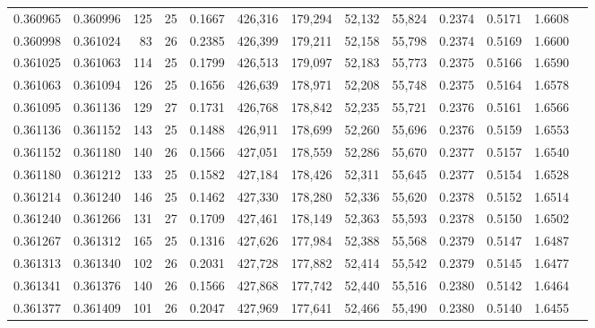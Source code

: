 \begin{tabular}{rrrrrrrrrrrrr}
0.360965 & 0.360996 &   125 &  25 &                                     0.1667 & 426,316 & 179,294 &  52,132 &  55,824 & 0.2374 & 0.5171 & 1.6608 \\
0.360998 & 0.361024 &    83 &  26 &                                     0.2385 & 426,399 & 179,211 &  52,158 &  55,798 & 0.2374 & 0.5169 & 1.6600 \\
0.361025 & 0.361063 &   114 &  25 &                                     0.1799 & 426,513 & 179,097 &  52,183 &  55,773 & 0.2375 & 0.5166 & 1.6590 \\
0.361063 & 0.361094 &   126 &  25 &                                     0.1656 & 426,639 & 178,971 &  52,208 &  55,748 & 0.2375 & 0.5164 & 1.6578 \\
0.361095 & 0.361136 &   129 &  27 &                                     0.1731 & 426,768 & 178,842 &  52,235 &  55,721 & 0.2376 & 0.5161 & 1.6566 \\
0.361136 & 0.361152 &   143 &  25 &                                     0.1488 & 426,911 & 178,699 &  52,260 &  55,696 & 0.2376 & 0.5159 & 1.6553 \\
0.361152 & 0.361180 &   140 &  26 &                                     0.1566 & 427,051 & 178,559 &  52,286 &  55,670 & 0.2377 & 0.5157 & 1.6540 \\
0.361180 & 0.361212 &   133 &  25 &                                     0.1582 & 427,184 & 178,426 &  52,311 &  55,645 & 0.2377 & 0.5154 & 1.6528 \\
0.361214 & 0.361240 &   146 &  25 &                                     0.1462 & 427,330 & 178,280 &  52,336 &  55,620 & 0.2378 & 0.5152 & 1.6514 \\
0.361240 & 0.361266 &   131 &  27 &                                     0.1709 & 427,461 & 178,149 &  52,363 &  55,593 & 0.2378 & 0.5150 & 1.6502 \\
0.361267 & 0.361312 &   165 &  25 &                                     0.1316 & 427,626 & 177,984 &  52,388 &  55,568 & 0.2379 & 0.5147 & 1.6487 \\
0.361313 & 0.361340 &   102 &  26 &                                     0.2031 & 427,728 & 177,882 &  52,414 &  55,542 & 0.2379 & 0.5145 & 1.6477 \\
0.361341 & 0.361376 &   140 &  26 &                                     0.1566 & 427,868 & 177,742 &  52,440 &  55,516 & 0.2380 & 0.5142 & 1.6464 \\
0.361377 & 0.361409 &   101 &  26 &                                     0.2047 & 427,969 & 177,641 &  52,466 &  55,490 & 0.2380 & 0.5140 & 1.6455 \\

\end{tabular}
